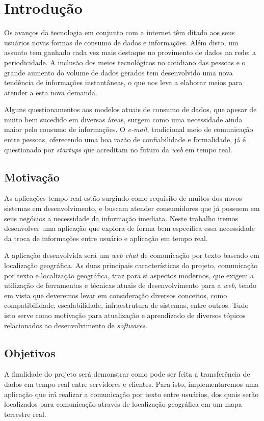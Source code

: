 \chapter{Introdução}
Os avanços da tecnologia em conjunto com a internet têm ditado aos seus usuários novas formas de consumo de dados e informações. Além disto, um assunto tem ganhado cada vez mais destaque no provimento de dados na rede: a periodicidade. A inclusão dos meios tecnológicos no cotidiano das pessoas e o grande aumento do volume de dados gerados tem desenvolvido uma nova tendência de informações instantâneas, o que nos leva a elaborar meios para atender a esta nova demanda.

Alguns questionamentos aos modelos atuais de consumo de dados, que apesar de muito bem sucedido em diversas áreas, surgem como uma necessidade ainda maior pelo consumo de informações. O \textit{e-mail}, tradicional meio de comunicação entre pessoas, oferecendo uma boa razão de confiabilidade e formalidade, já é questionado por \textit{startups} \cite{startup-email-innovation1} \cite{startup-email-innovation2} que acreditam no futuro da \textit{web} em tempo real.

\section{Motivação} 
As aplicações tempo-real estão surgindo como requisito de muitos dos novos sistemas em desenvolvimento, e buscam atender consumidores que já possuem em seus negócios a necessidade da informação imediata. Neste trabalho iremos desenvolver uma aplicação que explora de forma bem específica essa necessidade da troca de informações entre usuário e aplicação em tempo real.

A aplicação desenvolvida será um \textit{web chat} de comunicação por texto baseado em localização geográfica. As duas principais características do projeto, comunicação por texto e localização geográfica, traz para si aspectos modernos, que exigem a utilização de ferramentas e técnicas atuais de desenvolvimento para a \textit{web}, tendo em vista que deveremos levar em consideração diversos conceitos, como compatibilidade, escalabilidade, infraestrutura de sistemas, entre outros. Tudo isto serve como motivação para atualização e aprendizado de diversos tópicos relacionados ao desenvolvimento de \textit{softwares}.   

\section{Objetivos}
A finalidade do projeto será demonstrar como pode ser feita a transferência de dados em tempo real entre servidores e clientes. Para isto, implementaremos uma aplicação que irá realizar a comunicação por texto entre usuários, dos quais serão localizados para comunicação através de localização geográfica em um mapa terrestre real.

